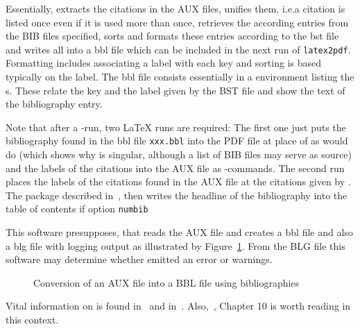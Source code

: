 Essentially,  extracts the citations in the AUX files, 
unifies them, i.e.\@ a citation is listed once even if it is used more than once, 
retrieves the according entries from the BIB files specified, 
sorts and formats these entries 
according to the \gls{bst} file and writes all into a \gls{bbl} file 
which can be included in the next run of \texttt{latex2pdf}. 
Formatting includes associating a label with each key 
and sorting is based typically on the label. 
The \gls{bbl} file consists essentially in a  environment 
listing the s. 
These relate the key and the label given by the BST file 
and show the text of the bibliography entry. 

Note that after a -run, 
two \LaTeX{} runs are required: 
The first one just puts the bibliography found in the \gls{bbl} file \texttt{xxx.bbl}
into the PDF file at place of  as  would do 
(which shows why  is singular, although a list of BIB files may serve as source)
and the labels of the citations into the AUX file 
as -commands. 
The second run places the labels of the citations found in the AUX file 
at the citations given by . 
The package  described in~\cite{TocBibIndP}, 
then writes the headline of the bibliography 
into the table of contents 
if option \texttt{numbib}



This software presupposes, that  reads the AUX file 
and creates a \gls{bbl} file and also a \gls{blg} file with logging output 
as illustrated by Figure~\ref{fig:aux2bbl}. 
From the BLG file this software may determine 
whether  emitted an error or warnings. 


\begin{figure}[htb]
\centering
{}
\caption{\label{fig:aux2bbl}
Conversion of an AUX file into a BBL file using bibliographies}%
\end{figure}

Vital information on  is found in~\cite{BibPat} 
and in~\cite{BibMar}. 
Also,~\cite{Gra}, Chapter 10 is worth reading in this context. 

